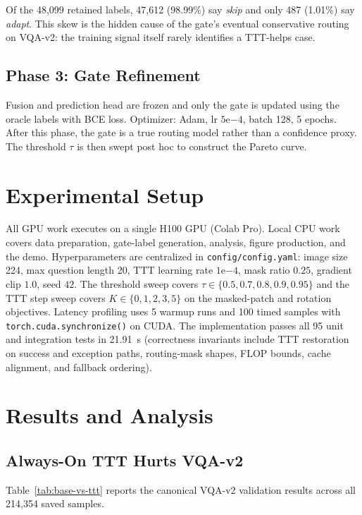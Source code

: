 \documentclass[conference]{IEEEtran}
\begin{document}
\noindent Of the 48{,}099 retained labels, 47{,}612 (98.99\%) say
\emph{skip} and only 487 (1.01\%) say \emph{adapt}. This skew is the
hidden cause of the gate's eventual conservative routing on VQA-v2: the
training signal itself rarely identifies a TTT-helps case.

\subsection{Phase 3: Gate Refinement}

Fusion and prediction head are frozen and only the gate is updated using
the oracle labels with BCE loss. Optimizer: Adam, lr $5\mathrm{e}{-4}$,
batch 128, 5 epochs. After this phase, the gate is a true routing model
rather than a confidence proxy. The threshold $\tau$ is then swept post
hoc to construct the Pareto curve.

\section{Experimental Setup}

All GPU work executes on a single H100 GPU (Colab Pro). Local CPU work
covers data preparation, gate-label generation, analysis, figure
production, and the demo. Hyperparameters are centralized in
\texttt{config/config.yaml}: image size 224, max question length 20,
TTT learning rate $1\mathrm{e}{-4}$, mask ratio $0.25$, gradient clip
$1.0$, seed $42$. The threshold sweep covers
$\tau \in \{0.5, 0.7, 0.8, 0.9, 0.95\}$ and the TTT step sweep covers
$K \in \{0, 1, 2, 3, 5\}$ on the masked-patch and rotation objectives.
Latency profiling uses 5 warmup runs and 100 timed samples with
\texttt{torch.cuda.synchronize()} on CUDA. The implementation passes
all 95 unit and integration tests in 21.91~s (correctness invariants
include TTT restoration on success and exception paths, routing-mask
shapes, FLOP bounds, cache alignment, and fallback ordering).

\section{Results and Analysis}

\subsection{Always-On TTT Hurts VQA-v2}

Table~\ref{tab:base-vs-ttt} reports the canonical VQA-v2 validation
results across all 214{,}354 saved samples.
\end{document}
